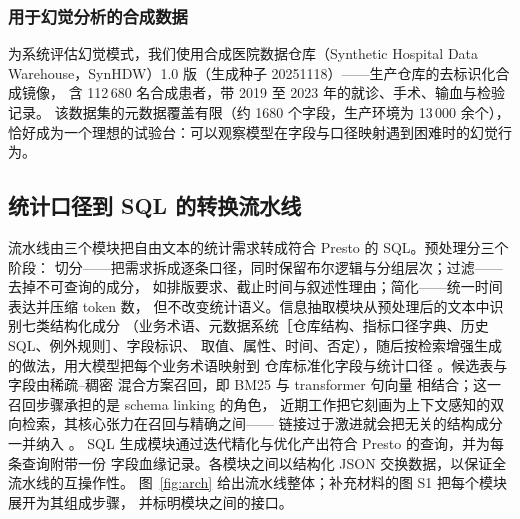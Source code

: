 \documentclass[11pt,a4paper]{article}
\begin{document}
\subsubsection{用于幻觉分析的合成数据}
为系统评估幻觉模式，我们使用合成医院数据仓库（Synthetic Hospital Data
Warehouse，SynHDW）1.0 版（生成种子 20251118）——生产仓库的去标识化合成镜像，
含 112\,680 名合成患者，带 2019 至 2023 年的就诊、手术、输血与检验记录。
该数据集的元数据覆盖有限（约 1680 个字段，生产环境为 13\,000 余个），
恰好成为一个理想的试验台：可以观察模型在字段与口径映射遇到困难时的幻觉行为。

\subsection{统计口径到 SQL 的转换流水线}
流水线由三个模块把自由文本的统计需求转成符合 Presto 的 SQL。预处理分三个阶段：
切分——把需求拆成逐条口径，同时保留布尔逻辑与分组层次；过滤——去掉不可查询的成分，
如排版要求、截止时间与叙述性理由；简化——统一时间表达并压缩 token 数，
但不改变统计语义。信息抽取模块从预处理后的文本中识别七类结构化成分
（业务术语、元数据系统［仓库结构、指标口径字典、历史 SQL、例外规则］、字段标识、
取值、属性、时间、否定），随后按检索增强生成的做法，用大模型把每个业务术语映射到
仓库标准化字段与统计口径 \cite{lewis2020,finardi2024}。候选表与字段由稀疏--稠密
混合方案召回，即 BM25 \cite{bm252009} 与 transformer 句向量
\cite{sbert2019,bert2019} 相结合；这一召回步骤承担的是 schema linking 的角色，
近期工作把它刻画为上下文感知的双向检索，其核心张力在召回与精确之间——
链接过于激进就会把无关的结构成分一并纳入 \cite{schemalink2025,rslsql2024}。
SQL 生成模块通过迭代精化与优化产出符合 Presto 的查询，并为每条查询附带一份
字段血缘记录。各模块之间以结构化 JSON 交换数据，以保证全流水线的互操作性。
图~\ref{fig:arch} 给出流水线整体；补充材料的图 S1 把每个模块展开为其组成步骤，
并标明模块之间的接口。
\end{document}
